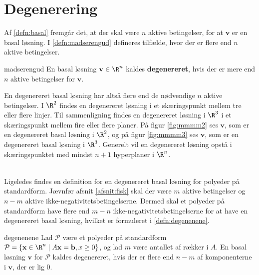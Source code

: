 \section{Degenerering}
Af \ref{defn:basal} fremgår det, at der skal være $n$ aktive betingelser, for at $\mathbf{v}$ er en basal løsning. 
I \ref{defn:madserengud} defineres tilfælde, hvor der er flere end $n$ aktive betingelser. 
%
\begin{defn}{}{madserengud}
En basal løsning $\mathbf{v} \in \R^n$ kaldes \textbf{degenereret}, hvis der er mere end $n$ aktive betingelser for $\mathbf{v}$.
\end{defn}
\noindent
%
En degenereret basal løsning har altså flere end de nødvendige $n$ aktive betingelser.
% 
I $\R^2$ findes en degenereret løsning i et skæringspunkt mellem tre eller flere linjer. 
Til sammenligning findes en degenereret løsning i $\R^3$ i et skæringspunkt mellem fire eller flere planer. 
På figur \ref{fig:mmmm2} ses $\mathbf{v}$, som er en degenereret basal løsning i $\R^2$, og på figur  \ref{fig:mmmm3} ses $\mathbf{v}$, som er en degenereret basal løsning i $\R^3$.
Generelt vil en degenereret løsning opstå i skæringspunktet med mindst $n+1$ hyperplaner i $\R^n$.
%
%
\begin{center}
$
\begin{array}{cc}
&

\end{array}
$
\end{center}
%
%
Ligeledes findes en definition for en degenereret basal løsning for polyeder på standardform. 
Jævnfør afsnit \ref{afsnit:fisk} skal der være $m$ aktive betingelser og $n-m$ aktive ikke-negativitetsbetingelserne. 
Dermed skal et polyeder på standardform have flere end $m-n$ ikke-negativitetsbetingelserne for at have en degenereret basal løsning, hvilket er formuleret i \ref{defn:degenenene}. 
%
\begin{defn}{}{degenenene}
Lad $\mathcal{P}$ være et polyeder på standardform
$\mathcal{P}=\{ \mathbf{x} \in \R^n \mid A \mathbf{x}=\mathbf{b},x \geq 0 \}$, og lad $m$ være antallet af rækker i $A$.
En basal løsning $\mathbf{v}$ for $\mathcal{P}$ kaldes degenereret, hvis der er flere end $n-m$ af komponenterne i $\mathbf{v}$, der er lig $0$.
\end{defn}
%
